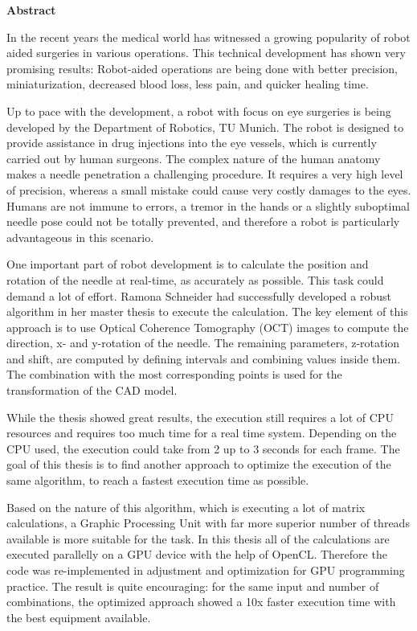 
\cleardoublepage

\vspace*{2cm}
\begin{center}
{\Large \textbf{Abstract}}
\end{center}
\vspace{1cm}
In the recent years the medical world has witnessed a growing popularity of robot aided surgeries in various operations. This technical development has shown very promising results: Robot-aided operations are being done with better precision, miniaturization, decreased blood loss, less pain, and quicker healing time. 

Up to pace with the development, a robot with focus on eye surgeries is being developed by the Department of Robotics, TU Munich. The robot is designed to provide assistance in drug injections into the eye vessels, which is currently carried out by human surgeons. The complex nature of the human anatomy makes a needle penetration a challenging procedure. It requires a very high level of precision, whereas a small mistake could cause very costly damages to the eyes. Humans are not immune to errors, a tremor in the hands or a slightly suboptimal needle pose could not be totally prevented, and therefore a robot is particularly advantageous in this scenario.

One important part of robot development is to calculate the position and rotation of the needle at real-time, as accurately as possible. This task could demand a lot of effort. Ramona Schneider had successfully developed a robust algorithm in her master thesis to execute the calculation. The key element of this approach is to use Optical Coherence Tomography (OCT) images to compute the direction, x- and y-rotation of the needle. The remaining parameters, z-rotation and shift, are computed by defining intervals and combining values inside them. The combination with the most corresponding points is used for the transformation of the CAD model.

While the thesis showed great results, the execution still requires a lot of CPU resources and requires too much time for a real time system. Depending on the CPU used, the execution could take from 2 up to 3 seconds for each frame. The goal of this thesis is to find another approach to optimize the execution of the same algorithm, to reach a fastest execution time as possible.

Based on the nature of this algorithm, which is executing a lot of matrix calculations, a Graphic Processing Unit with far more superior number of threads available is more suitable for the task. In this thesis all of the calculations are executed parallelly on a GPU device with the help of OpenCL. Therefore the code was re-implemented in adjustment and optimization for GPU programming practice. The result is quite encouraging: for the same input and number of combinations, the optimized approach showed a 10x faster execution time with the best equipment available. 

